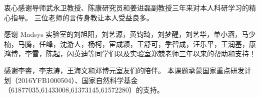 
\begin{acknowledgements}
  衷心感谢导师武永卫教授、陈康研究员和姜进磊副教授三年来对本人科研学习的精心指导。
  三位老师的言传身教让本人受益良多。

  感谢 Madsys 实验室的刘旭阳，刘艺源，黄钧琦，刘梦醒，刘艺华，单小涵，马少楠，马腾，任峰，沈游人，杨柯，宦成颖，王舒可，季智成，汪乐平，王润基，康鸿博，李雪，陈起，闪英迪等同学们以及实验室郑兢老师三年以来的帮助和支持！

  感谢李睿，李志涛，王海文和邓博元室友们的陪伴。
  本课题承蒙国家重点研发计划（2016YFB1000504）、国家自然科学基金（61877035,61433008,61373145,61572280）的支持。
\end{acknowledgements}

